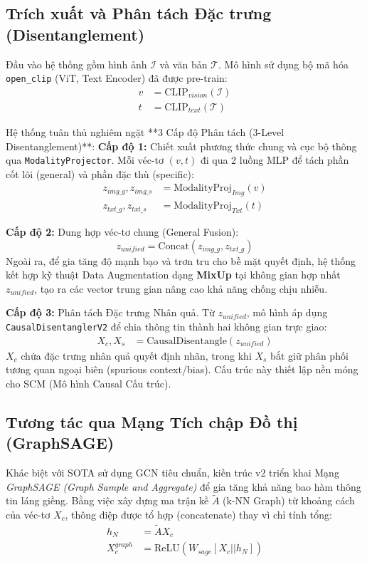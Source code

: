 \documentclass[11pt,a4paper]{article}
\begin{document}
\subsection{Trích xuất và Phân tách Đặc trưng (Disentanglement)}
Đầu vào hệ thống gồm hình ảnh $\mathcal{I}$ và văn bản $\mathcal{T}$. Mô hình sử dụng bộ mã hóa \texttt{open\_clip} (ViT, Text Encoder) đã được pre-train:
\begin{align}
v &= \text{CLIP}_{vision}(\mathcal{I}) \nonumber \\
t &= \text{CLIP}_{text}(\mathcal{T})
\end{align}

Hệ thống tuân thủ nghiêm ngặt **3 Cấp độ Phân tách (3-Level Disentanglement)**:
\textbf{Cấp độ 1:} Chiết xuất phương thức chung và cục bộ thông qua \texttt{ModalityProjector}. Mỗi véc-tơ $(v, t)$ đi qua 2 luồng MLP để tách phần cốt lõi (general) và phần đặc thù (specific):
\begin{align}
z_{img\_g}, z_{img\_s} &= \text{ModalityProj}_{Img}(v) \\
z_{txt\_g}, z_{txt\_s} &= \text{ModalityProj}_{Txt}(t)
\end{align}

\textbf{Cấp độ 2:} Dung hợp véc-tơ chung (General Fusion):
\begin{equation}
z_{unified} = \text{Concat}(z_{img\_g}, z_{txt\_g})
\end{equation}
Ngoài ra, để gia tăng độ mạnh bạo và trơn tru cho bề mặt quyết định, hệ thống kết hợp kỹ thuật Data Augmentation dạng \textbf{MixUp} tại không gian hợp nhất $z_{unified}$, tạo ra các vector trung gian nâng cao khả năng chống chịu nhiễu.

\textbf{Cấp độ 3:} Phân tách Đặc trưng Nhân quả. Từ $z_{unified}$, mô hình áp dụng \texttt{CausalDisentanglerV2} để chia thông tin thành hai không gian trực giao:
\begin{align}
X_c, X_s &= \text{CausalDisentangle}(z_{unified})
\end{align}
$X_c$ chứa đặc trưng nhân quả quyết định nhãn, trong khi $X_s$ bắt giữ phân phối tương quan ngoại biên (spurious context/bias). Cấu trúc này thiết lập nền móng cho SCM (Mô hình Causal Cấu trúc).

\subsection{Tương tác qua Mạng Tích chập Đồ thị (GraphSAGE)}
Khác biệt với SOTA sử dụng GCN tiêu chuẩn, kiến trúc v2 triển khai Mạng \textit{GraphSAGE (Graph Sample and Aggregate)} để gia tăng khả năng bao hàm thông tin láng giềng. Bằng việc xây dựng ma trận kề $\tilde{A}$ (k-NN Graph) từ khoảng cách của véc-tơ $X_c$, thông điệp được tổ hợp (concatenate) thay vì chỉ tính tổng:
\begin{align}
h_N &= \tilde{A} X_c \\
X_c^{graph} &= \text{ReLU}\left( W_{sage} [X_c || h_N] \right)
\end{align}
\end{document}
